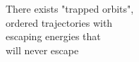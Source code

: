 \documentclass[preview]{standalone}
\begin{document}
There exists "trapped orbits",\\ordered trajectories with\\escaping energies that\\will never escape\\
\end{document}
